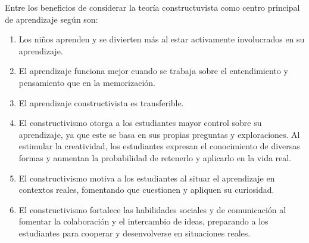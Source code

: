 Entre los beneficios de considerar la teoría constructuvista como centro principal de aprendizaje según \cite{} son:

\begin{enumerate}
    \item Los niños aprenden y se divierten más al estar activamente involucrados en su aprendizaje.
    \item El aprendizaje funciona mejor cuando se trabaja sobre el entendimiento y pensamiento que en la memorización.
    \item El aprendizaje constructivista es transferible.
    \item El constructivismo otorga a los estudiantes mayor control sobre su aprendizaje, ya que este se basa en sus propias preguntas y exploraciones. Al estimular la creatividad, los estudiantes expresan el conocimiento de diversas formas y aumentan la probabilidad de retenerlo y aplicarlo en la vida real.
    \item El constructivismo motiva a los estudiantes al situar el aprendizaje en contextos reales, fomentando que cuestionen y apliquen su curiosidad.
    \item El constructivismo fortalece las habilidades sociales y de comunicación al fomentar la colaboración y el intercambio de ideas, preparando a los estudiantes para cooperar y desenvolverse en situaciones reales.

\end{enumerate}